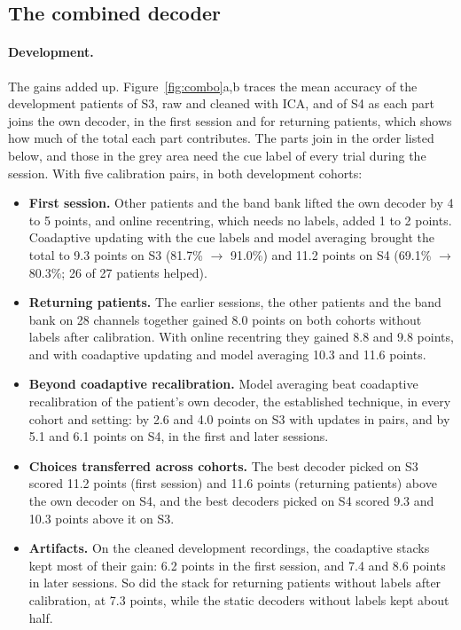 \documentclass[pdflatex,sn-mathphys-num]{sn-jnl}
\begin{document}
\subsection{The combined decoder}\label{sec:res-combo}

\paragraph{Development.} The gains added up. Figure~\ref{fig:combo}a,b traces the mean accuracy of the development patients of S3, raw and cleaned with ICA, and of S4 as each part joins the own decoder, in the first session and for returning patients, which shows how much of the total each part contributes. The parts join in the order listed below, and those in the grey area need the cue label of every trial during the session. With five calibration pairs, in both development cohorts:
\begin{itemize}
\item \textbf{First session.} Other patients and the band bank lifted the own decoder by 4 to 5 points, and online recentring, which needs no labels, added 1 to 2 points. Coadaptive updating with the cue labels and model averaging brought the total to 9.3 points on S3 (81.7\% $\rightarrow$ 91.0\%) and 11.2 points on S4 (69.1\% $\rightarrow$ 80.3\%; 26 of 27 patients helped).
\item \textbf{Returning patients.} The earlier sessions, the other patients and the band bank on 28 channels together gained 8.0 points on both cohorts without labels after calibration. With online recentring they gained 8.8 and 9.8 points, and with coadaptive updating and model averaging 10.3 and 11.6 points.
\item \textbf{Beyond coadaptive recalibration.} Model averaging beat coadaptive recalibration of the patient's own decoder, the established technique, in every cohort and setting: by 2.6 and 4.0 points on S3 with updates in pairs, and by 5.1 and 6.1 points on S4, in the first and later sessions.
\item \textbf{Choices transferred across cohorts.} The best decoder picked on S3 scored 11.2 points (first session) and 11.6 points (returning patients) above the own decoder on S4, and the best decoders picked on S4 scored 9.3 and 10.3 points above it on S3.
\item \textbf{Artifacts.} On the cleaned development recordings, the coadaptive stacks kept most of their gain: 6.2 points in the first session, and 7.4 and 8.6 points in later sessions. So did the stack for returning patients without labels after calibration, at 7.3 points, while the static decoders without labels kept about half.
\end{itemize}
\end{document}
